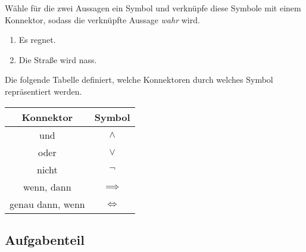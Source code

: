 \documentclass{uebungsblatt}
\begin{document}
\begin{exercise}

    Wähle für die zwei Aussagen ein Symbol und verknüpfe diese Symbole mit einem Konnektor, sodass die verknüpfte Aussage \emph{wahr} wird.

    \begin{enumerate}
        \item Es regnet.
        \item Die Straße wird nass.
    \end{enumerate}

    \begin{answerbox}[1in]

    \end{answerbox}

\end{exercise}

\newpage


\begin{definition}
    Die folgende Tabelle definiert, welche Konnektoren durch welches Symbol repräsentiert werden.
    \begin{center}
        \begin{tabular}{cc}\toprule
                        Konnektor & Symbol\\\midrule
                    und &  $\land$\\
                        oder&  $\lor$ \\
                        nicht & $\lnot$ \\
                        wenn, dann& $\implies$\\
                        genau dann, wenn&  $\iff$ \\
                        \bottomrule
        \end{tabular}
    \end{center}
\end{definition}

\subsection*{Aufgabenteil}
\end{document}
